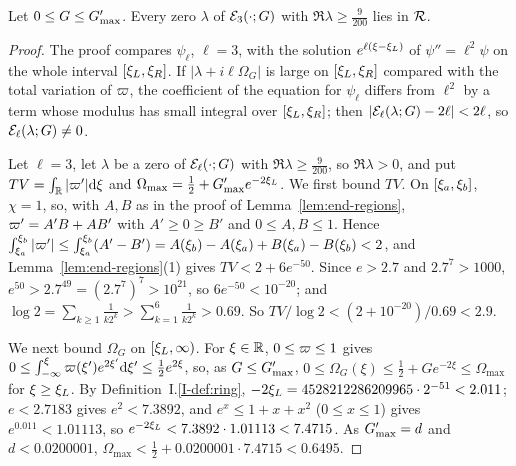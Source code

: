 \begin{lemma}
\label{lem:apriori}
Let $0\le G\le G_{\max}'$. Every zero $\lambda$ of $\mathcal{E}_3(\cdot;G)$ with
$\Re\lambda\ge\frac9{200}$ lies in $\mathcal{R}$.
\end{lemma}
\begin{proof}
The proof compares $\psi_\ell$, $\ell=3$, with the solution $e^{\ell(\xi-\xi_L)}$ of
$\psi''=\ell^2\psi$ on the whole interval $[\xi_L,\xi_R]$. If $|\lambda+i\ell\Omega_G|$
is large on $[\xi_L,\xi_R]$ compared with the total variation of $\varpi$, the
coefficient of the equation for $\psi_\ell$ differs from $\ell^2$ by a term whose
modulus has small integral over $[\xi_L,\xi_R]$; then
$|\mathcal{E}_\ell(\lambda;G)-2\ell|<2\ell$, so $\mathcal{E}_\ell(\lambda;G)\ne0$.

Let $\ell=3$, let $\lambda$ be a zero of $\mathcal{E}_\ell(\cdot;G)$ with
$\Re\lambda\ge\frac9{200}$, so $\Re\lambda>0$, and put $TV=\int_{\mathbb{R}}|\varpi'|\dd\xi$ and
$\Omega_{\max}=\frac12+G_{\max}'e^{-2\xi_L}$. We first bound $TV$. On $[\xi_a,\xi_b]$, $\chi=1$, so, with $A,B$ as in the proof of
Lemma~\ref{lem:end-regions}, $\varpi'=A'B+AB'$ with $A'\ge0\ge B'$ and $0\le A,B\le1$.
Hence $\int_{\xi_a}^{\xi_b}|\varpi'|\le\int_{\xi_a}^{\xi_b}(A'-B')
=A(\xi_b)-A(\xi_a)+B(\xi_a)-B(\xi_b)<2$, and Lemma~\ref{lem:end-regions}(1) gives
$TV<2+6e^{-50}$. Since $e>2.7$ and $2.7^7>1000$, $e^{50}>2.7^{49}=(2.7^7)^7>10^{21}$, so
$6e^{-50}<10^{-20}$; and
$\log2=\sum_{k\ge1}\frac1{k2^k}>\sum_{k=1}^6\frac1{k2^k}>0.69$. So
$TV/\log2<(2+10^{-20})/0.69<2.9$.

We next bound $\Omega_G$ on $[\xi_L,\infty)$. For $\xi\in\mathbb{R}$, $0\le\varpi\le1$ gives
$0\le\int_{-\infty}^\xi\varpi(\xi')e^{2\xi'}\dd\xi'\le\frac12e^{2\xi}$, so, as
$G\le G_{\max}'$,
$0\le\Omega_G(\xi)\le\frac12+Ge^{-2\xi}\le\Omega_{\max}$ for $\xi\ge\xi_L$. By
Definition~I.\ref{I-def:ring}, $-2\xi_L=4528212286209965\cdot2^{-51}<2.011$; $e<2.7183$ gives $e^2<7.3892$, and
$e^x\le1+x+x^2$ ($0\le x\le1$) gives $e^{0.011}<1.01113$, so
$e^{-2\xi_L}<7.3892\cdot1.01113<7.4715$. As $G_{\max}'=d$ and $d<0.0200001$,
$\Omega_{\max}<\frac12+0.0200001\cdot7.4715<0.6495$.


\end{proof}
